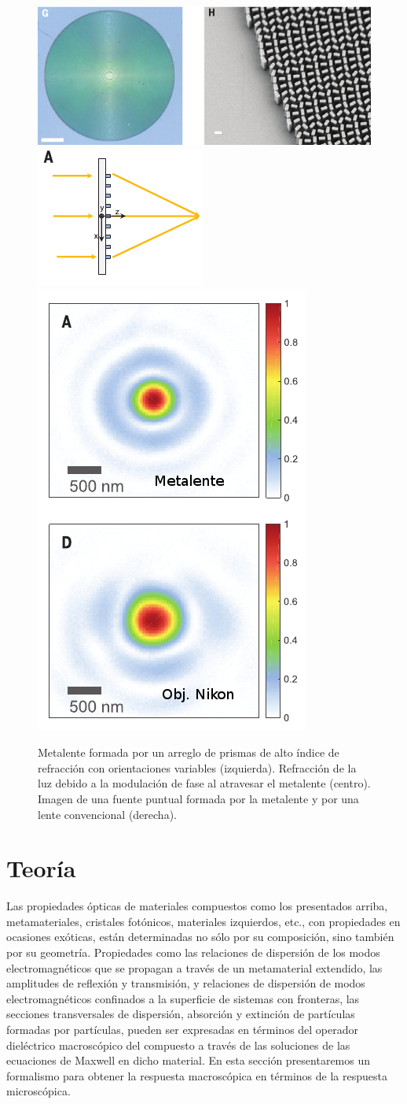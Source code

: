 \documentclass[12pt]{article}
\begin{document}
\begin{figure}
  \centering
  \includegraphics[width=.5\textwidth,angle=90, valign=c]{metasup3}
  \includegraphics[height=.3\textwidth,valign=c]{metasup5}
  \includegraphics[height=.5\textwidth,valign=c]{metasup4}
\caption{Metalente formada por un arreglo de prismas de alto índice
    de refracción con orientaciones variables (izquierda). Refracción
    de la luz debido a la modulación de fase al atravesar el metalente
    (centro). Imagen de una
    fuente puntual formada por la metalente y por una lente
    convencional (derecha). }
  \label{fig:metalente}
\end{figure}


\section{Teoría}

Las propiedades ópticas de materiales compuestos como los presentados
arriba, metamateriales, cristales fotónicos, materiales izquierdos,
etc., con propiedades en ocasiones exóticas, están determinadas no
sólo por su composición, sino también por su geometría. Propiedades
como las relaciones de dispersión de los modos electromagnéticos que
se propagan a través de un metamaterial extendido, las amplitudes de
reflexión y transmisión, y relaciones de dispersión de modos
electromagnéticos confinados a la superficie de sistemas con
fronteras, las secciones transversales de dispersión, absorción y
extinción de partículas formadas por partículas, pueden ser expresadas
en términos del operador dieléctrico macroscópico del compuesto a
través de las soluciones de las ecuaciones de Maxwell en dicho
material. En esta sección presentaremos un formalismo para obtener la
respuesta macroscópica en términos de la respuesta microscópica.
\end{document}
